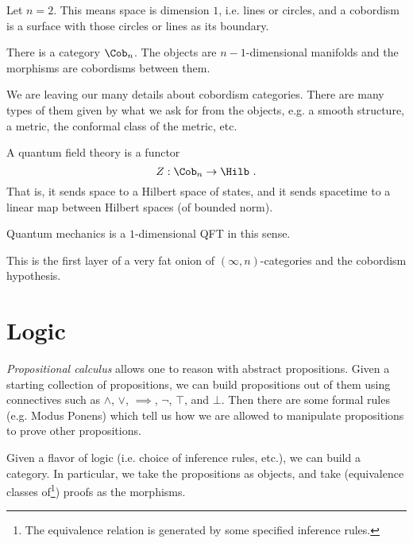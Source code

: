 \documentclass[11pt]{amsart}
\begin{document}
\begin{exm}
Let $n = 2$. This means space is dimension $1$, i.e. lines or circles, and 
a cobordism is a surface with those circles or lines as its boundary.
\end{exm}

\begin{thm}
There is a category $\Cob_n$. The objects are $n-1$-dimensional manifolds and the
morphisms are cobordisms between them.
\end{thm}

\begin{wrn}
We are leaving our many details about cobordism categories.
There are many types of them given by what we ask for from the objects, e.g. a smooth
structure, a metric, the
conformal class of the metric, etc.
\end{wrn}

\begin{defn}
A quantum field theory is a functor
\begin{equation}
Z : \Cob_n \to \Hilb \ .
\end{equation}
That is, it sends space to a Hilbert space of states, and it sends spacetime to a linear
map between Hilbert spaces (of bounded norm).
\end{defn}

\begin{exm}
Quantum mechanics is a $1$-dimensional QFT in this sense.
\end{exm}

\begin{rmk}
This is the first layer of a very fat onion of $\left(\infty , n\right)$-categories and
the cobordism hypothesis.
\end{rmk}

\section{Logic}

\emph{Propositional calculus} allows one to
reason with abstract propositions.
Given a starting collection of propositions, we can build propositions out of them
using connectives such as $\land$, $\lor$,
$\implies$, $\neg$, $\top$, and $\bot$.
Then there are some formal rules (e.g. Modus Ponens) which tell us how we are allowed to manipulate
propositions to prove other propositions.

Given a flavor of logic (i.e. choice of inference rules, etc.), we can build a category. 
In particular, we take the propositions as objects, and take (equivalence classes
of\footnote{The equivalence relation is generated by some specified inference rules.})
proofs as the morphisms.
\end{document}
